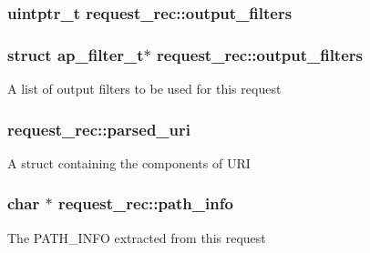 \subsubsection[{\texorpdfstring{output\+\_\+filters}{output_filters}}]{\setlength{\rightskip}{0pt plus 5cm}uintptr\+\_\+t request\+\_\+rec\+::output\+\_\+filters}\hypertarget{structrequest__rec_aa02da9eb35e54fb4f12e49592414bc8e}{}\label{structrequest__rec_aa02da9eb35e54fb4f12e49592414bc8e}
\subsubsection[{\texorpdfstring{output\+\_\+filters}{output_filters}}]{\setlength{\rightskip}{0pt plus 5cm}struct {\bf ap\+\_\+filter\+\_\+t}$\ast$ request\+\_\+rec\+::output\+\_\+filters}\hypertarget{structrequest__rec_a2ef584f8431c6b1cde8f79435f39e84a}{}\label{structrequest__rec_a2ef584f8431c6b1cde8f79435f39e84a}
A list of output filters to be used for this request 
\subsubsection[{\texorpdfstring{parsed\+\_\+uri}{parsed_uri}}]{ request\+\_\+rec\+::parsed\+\_\+uri}\hypertarget{structrequest__rec_a778f7883e201095a1d914ab7422635eb}{}\label{structrequest__rec_a778f7883e201095a1d914ab7422635eb}
A struct containing the components of U\+RI 
\subsubsection[{\texorpdfstring{path\+\_\+info}{path_info}}]{\setlength{\rightskip}{0pt plus 5cm}char $\ast$ request\+\_\+rec\+::path\+\_\+info}\hypertarget{structrequest__rec_a9d8a42a25fbd0fe2facab68e58e701db}{}\label{structrequest__rec_a9d8a42a25fbd0fe2facab68e58e701db}
The P\+A\+T\+H\+\_\+\+I\+N\+FO extracted from this request 
